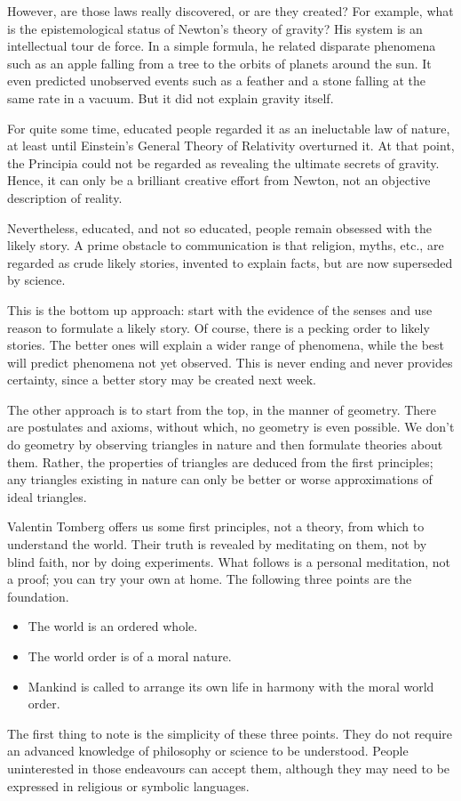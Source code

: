 However, are those laws really discovered, or are they created? For example, what is the epistemological status of Newton's theory of gravity? His system is an intellectual tour de force. In a simple formula, he related disparate phenomena such as an apple falling from a tree to the orbits of planets around the sun. It even predicted unobserved events such as a feather and a stone falling at the same rate in a vacuum. But it did not explain gravity itself.

For quite some time, educated people regarded it as an ineluctable law of nature, at least until Einstein's General Theory of Relativity overturned it. At that point, the Principia could not be regarded as revealing the ultimate secrets of gravity. Hence, it can only be a brilliant creative effort from Newton, not an objective description of reality.

Nevertheless, educated, and not so educated, people remain obsessed with the likely story. A prime obstacle to communication is that religion, myths, etc., are regarded as crude likely stories, invented to explain facts, but are now superseded by science.

This is the bottom up approach: start with the evidence of the senses and use reason to formulate a likely story. Of course, there is a pecking order to likely stories. The better ones will explain a wider range of phenomena, while the best will predict phenomena not yet observed. This is never ending and never provides certainty, since a better story may be created next week.

The other approach is to start from the top, in the manner of geometry. There are postulates and axioms, without which, no geometry is even possible. We don't do geometry by observing triangles in nature and then formulate theories about them. Rather, the properties of triangles are deduced from the first principles; any triangles existing in nature can only be better or worse approximations of ideal triangles.

Valentin Tomberg offers us some first principles, not a theory, from which to understand the world. Their truth is revealed by meditating on them, not by blind faith, nor by doing experiments. What follows is a personal meditation, not a proof; you can try your own at home. The following three points are the foundation.

\begin{itemize}
\item The world is an ordered whole. 
\item The world order is of a moral nature. 
\item Mankind is called to arrange its own life in harmony with the moral world order. 
\end{itemize}
The first thing to note is the simplicity of these three points. They do not require an advanced knowledge of philosophy or science to be understood. People uninterested in those endeavours can accept them, although they may need to be expressed in religious or symbolic languages.

